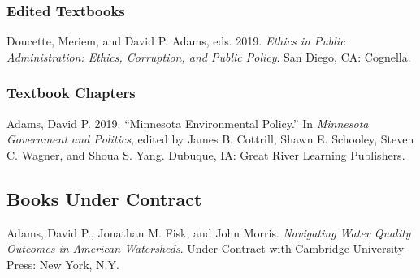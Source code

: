 \documentclass[12pt,letterpaper]{article}
\renewenvironment{itemize}{
  \begin{list}{}{
    \setlength{\leftmargin}{1.5em}
    \setlength{\itemsep}{0.25em}
    \setlength{\parskip}{0pt}
    \setlength{\parsep}{0.25em}
  }
}{
  \end{list}
}
\begin{document}
\subsubsection*{Edited Textbooks}
\begin{itemize}\leftmargin=2pt\itemindent=-15pt
  \item Doucette, Meriem, and David P. Adams, eds. 2019. \emph{Ethics in Public Administration: Ethics, Corruption, and Public Policy}. San Diego, CA: Cognella.
\end{itemize}

\subsubsection*{Textbook Chapters}
\begin{itemize}\leftmargin=2pt\itemindent=-15pt
  \item Adams, David P. 2019. ``Minnesota Environmental Policy.'' In \emph{Minnesota Government and Politics}, edited by James B. Cottrill, Shawn E. Schooley, Steven C. Wagner, and Shoua S. Yang. Dubuque, IA: Great River Learning Publishers.
\end{itemize}

\subsection*{Books Under Contract}

\begin{itemize}\leftmargin=2pt\itemindent=-15pt\leftmargin=2pt\itemindent=-15pt
  \item Adams, David P., Jonathan M. Fisk, and John Morris. \emph{Navigating Water Quality Outcomes in American Watersheds}. Under Contract with Cambridge University Press: New York, N.Y.
\end{itemize}
\end{document}
